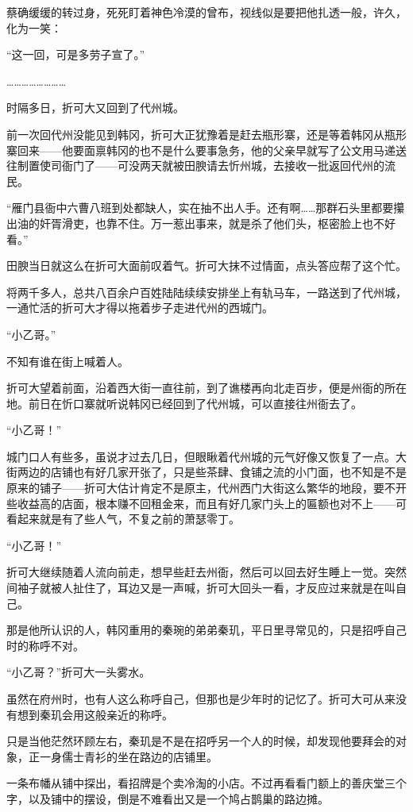 蔡确缓缓的转过身，死死盯着神色冷漠的曾布，视线似是要把他扎透一般，许久，化为一笑：

“这一回，可是多劳子宣了。”

……………………

时隔多日，折可大又回到了代州城。

前一次回代州没能见到韩冈，折可大正犹豫着是赶去瓶形寨，还是等着韩冈从瓶形寨回来——他要面禀韩冈的也不是什么要事急务，他的父亲早就写了公文用马递送往制置使司衙门了——可没两天就被田腴请去忻州城，去接收一批返回代州的流民。

“雁门县衙中六曹八班到处都缺人，实在抽不出人手。还有啊……那群石头里都要攥出油的奸胥滑吏，也靠不住。万一惹出事来，就是杀了他们头，枢密脸上也不好看。”

田腴当日就这么在折可大面前叹着气。折可大抹不过情面，点头答应帮了这个忙。

将两千多人，总共八百余户百姓陆陆续续安排坐上有轨马车，一路送到了代州城，一通忙活的折可大才得以拖着步子走进代州的西城门。

“小乙哥。”

不知有谁在街上喊着人。

折可大望着前面，沿着西大街一直往前，到了谯楼再向北走百步，便是州衙的所在地。前日在忻口寨就听说韩冈已经回到了代州城，可以直接往州衙去了。

“小乙哥！”

城门口人有些多，虽说才过去几日，但眼瞅着代州城的元气好像又恢复了一点。大街两边的店铺也有好几家开张了，只是些茶肆、食铺之流的小门面，也不知是不是原来的铺子——折可大估计肯定不是原主，代州西门大街这么繁华的地段，要不开些收益高的店面，根本赚不回租金来，而且有好几家门头上的匾额也对不上——可看起来就是有了些人气，不复之前的萧瑟零丁。

“小乙哥！”

折可大继续随着人流向前走，想早些赶去州衙，然后可以回去好生睡上一觉。突然间袖子就被人扯住了，耳边又是一声喊，折可大回头一看，才反应过来就是在叫自己。

那是他所认识的人，韩冈重用的秦琬的弟弟秦玑，平日里寻常见的，只是招呼自己时的称呼不对。

“小乙哥？”折可大一头雾水。

虽然在府州时，也有人这么称呼自己，但那也是少年时的记忆了。折可大可从来没有想到秦玑会用这般亲近的称呼。

只是当他茫然环顾左右，秦玑是不是在招呼另一个人的时候，却发现他要拜会的对象，正一身儒士青衫的坐在路边的店铺里。

一条布幡从铺中探出，看招牌是个卖冷淘的小店。不过再看看门额上的善庆堂三个字，以及铺中的摆设，倒是不难看出又是一个鸠占鹊巢的路边摊。

